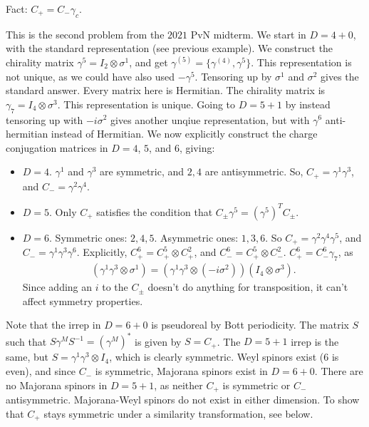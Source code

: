 \documentclass[11pt]{article}
\begin{document}
Fact: $C_+ = C_- \gamma_c$.

\begin{eexample}
    This is the second problem from the $2021$ PvN midterm.
    We start in $D = 4 + 0$, with the standard representation
    (see previous example). We construct the chirality matrix
    $\gamma^5 = I_2 \otimes \sigma^1$, and get $\gamma^{(5)} = \{ \gamma^{(4)}, \gamma^5 \}$.
    This representation is not unique, as we could have
    also used $- \gamma^5$. Tensoring up by $\sigma^1$
    and $\sigma^2$ gives the standard answer. Every matrix
    here is Hermitian. The chirality matrix is $\gamma_7 = I_4 \otimes \sigma^3$.
    This representation is unique. Going to $D = 5 + 1$ by
    instead tensoring up with $-i \sigma^2$ gives another
    unqiue representation, but with $\gamma^6$ anti-hermitian
    instead of Hermitian. We now explicitly construct the charge conjugation
    matrices in $D = 4$, $5$, and $6$, giving:
    \begin{itemize}
        \item $D = 4$. $\gamma^1$ and $\gamma^3$ are symmetric,
        and $2, 4$ are antisymmetric. So, $C_+ = \gamma^1 \gamma^3$,
        and $C_- = \gamma^2 \gamma^4$.
        \item $D = 5$. Only $C_+$ satisfies the condition that
        $C_\pm \gamma^5 = (\gamma^5)^T C_\pm$.
        \item $D = 6$. Symmetric ones: $2, 4, 5$. Asymmetric ones: $1, 3, 6$.
        So $C_+ = \gamma^2 \gamma^4 \gamma^5$, and $C_- = \gamma^1 \gamma^3 \gamma^6$.
        Explicitly, $C_+^6 = C_+^5 \otimes C_+^2$, and $C_-^6 = C_+^5 \otimes C_-^2$.
        $C_+^6 = C_-^6 \gamma_7$, as
        \begin{align*}
            (\gamma^1 \gamma^3 \otimes \sigma^1) = (\gamma^1 \gamma^3 \otimes (- i \sigma^2)) (I_4 \otimes \sigma^3).
        \end{align*}
        Since adding an $i$ to the $C_\pm$ doesn't do anything for transposition,
        it can't affect symmetry properties.
    \end{itemize}
    Note that the irrep in $D = 6 + 0$ is pseudoreal by Bott periodicity.
    The matrix $S$ such that $S \gamma^M S^{-1} = (\gamma^M)^*$ is given by
    $S = C_+$. The $D = 5 + 1$ irrep is the same, but $S = \gamma^1 \gamma^3 \otimes I_4$,
    which is clearly symmetric. Weyl spinors exist ($6$ is even), and 
    since $C_-$ is symmetric, Majorana spinors exist in $D = 6 + 0$.
    There are no Majorana spinors in $D = 5 + 1$, as neither $C_+$
    is symmetric or $C_-$ antisymmetric. Majorana-Weyl spinors do
    not exist in either dimension. To show that $C_+$ stays symmetric
    under a similarity transformation, see below.
\end{eexample}
\end{document}
